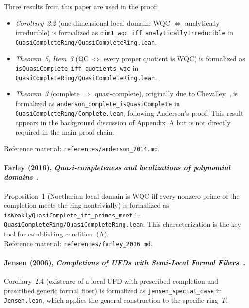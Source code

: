 \documentclass[]{pkuai4m}
\theoremstyle{plain}
\theoremstyle{definition}
\begin{document}
Three results from this paper are used in the proof:
\begin{itemize}
\item \emph{Corollary~2.2} (one-dimensional local domain: WQC $\Leftrightarrow$ analytically irreducible) is formalized as \texttt{dim1\_wqc\_iff\_analyticallyIrreducible} in \texttt{QuasiCompleteRing/QuasiCompleteRing.lean}.
\item \emph{Theorem~5, Item~3} (QC $\Leftrightarrow$ every proper quotient is WQC) is formalized as \texttt{isQuasiComplete\_iff\_quotients\_wqc} in \texttt{QuasiCompleteRing/QuasiCompleteRing.lean}.
\item \emph{Theorem~3} (complete $\Rightarrow$ quasi-complete), originally due to Chevalley~\cite{chevalley1943theory}, is formalized as \texttt{anderson\_complete\_isQuasiComplete} in \texttt{QuasiCompleteRing/Complete.lean}, following Anderson's proof. This result appears in the background discussion of Appendix~A but is not directly required in the main proof chain.
\end{itemize}
Reference material: \texttt{references/anderson\_2014.md}.

\paragraph{Farley (2016), \emph{Quasi-completeness and localizations of polynomial domains}~\cite{farley2016quasi}.}

Proposition~1 (Noetherian local domain is WQC iff every nonzero prime of the completion meets the ring nontrivially) is formalized as \texttt{isWeaklyQuasiComplete\_iff\_primes\_meet} in \texttt{QuasiCompleteRing/QuasiCompleteRing.lean}. This characterization is the key tool for establishing condition~(A).\\
Reference material: \texttt{references/farley\_2016.md}.

\paragraph{Jensen (2006), \emph{Completions of UFDs with Semi-Local Formal Fibers}~\cite{jensen2006completions}.}

Corollary~2.4 (existence of a local UFD with prescribed completion and prescribed generic formal fiber) is formalized as \texttt{jensen\_special\_case} in \texttt{Jensen.lean}, which applies the general construction to the specific ring~$T$.
\end{document}
